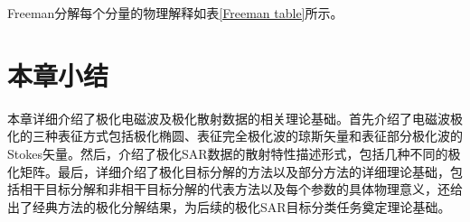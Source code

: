 \documentclass[promaster]{thesis-uestc}
\begin{document}
Freeman分解每个分量的物理解释如表\ref{Freeman table}所示。
\begin{table}[!ht]
    \caption{Freeman分解}
    \label{Freeman table}
\end{table}

\section{本章小结}
本章详细介绍了极化电磁波及极化散射数据的相关理论基础。首先介绍了电磁波极化的三种表征方式包括极化椭圆、表征完全极化波的琼斯矢量和表征部分极化波的Stokes矢量。然后，介绍了极化SAR数据的散射特性描述形式，包括几种不同的极化矩阵。最后，详细介绍了极化目标分解的方法以及部分方法的详细理论基础，包括相干目标分解和非相干目标分解的代表方法以及每个参数的具体物理意义，还给出了经典方法的极化分解结果，为后续的极化SAR目标分类任务奠定理论基础。
\end{document}
